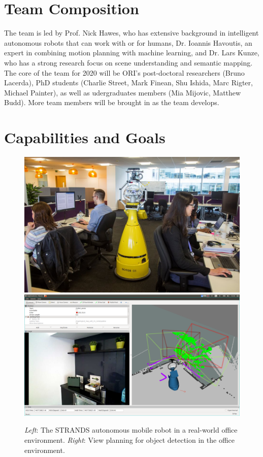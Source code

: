 \documentclass[runningheads,a4paper]{llncs}
\begin{document}
\section{Team Composition}

The team is led by Prof. Nick Hawes, who has extensive background in
intelligent autonomous robots that can work with or for humans, Dr. Ioannis Havoutis, an expert in combining motion planning with machine learning, and Dr. Lars Kunze, who has a strong research focus on scene understanding and semantic mapping. The core of the team for 2020 will be ORI's post-doctoral researchers (Bruno Lacerda), PhD students (Charlie Street, Mark Finean, Shu Ishida, Marc Rigter, Michael Painter), as well as udergraduates members (Mia Mijovic, Matthew Budd). More team members will be brought in as the team develops. 



\section{Capabilities and Goals}

\begin{figure}[tb]
  \begin{center}
    \includegraphics[width=.43\columnwidth]{images/betty.jpg}
    \includegraphics[width=.55\columnwidth,clip,trim=10ex 20ex 10ex 20ex]{images/viewplanning_at_tsc.png}
  \end{center} 
  \vspace{-10pt}  
  \caption{\textit{Left}: The STRANDS autonomous mobile robot in a real-world
  office environment. \textit{Right}: View planning for object detection in the
  office environment.}
  \label{fig:mk}
  \vspace{-3ex}
\end{figure}
\end{document}
